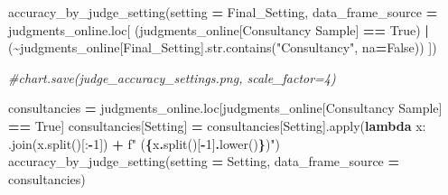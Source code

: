 \documentclass[
]{article}
\newenvironment{Shaded}{\begin{snugshade}}{\end{snugshade}}
\newcommand{\BuiltInTok}[1]{#1}
\newcommand{\CommentTok}[1]{\textcolor[rgb]{0.56,0.35,0.01}{\textit{#1}}}
\newcommand{\DecValTok}[1]{\textcolor[rgb]{0.00,0.00,0.81}{#1}}
\newcommand{\KeywordTok}[1]{\textcolor[rgb]{0.13,0.29,0.53}{\textbf{#1}}}
\newcommand{\NormalTok}[1]{#1}
\newcommand{\OperatorTok}[1]{\textcolor[rgb]{0.81,0.36,0.00}{\textbf{#1}}}
\newcommand{\SpecialCharTok}[1]{\textcolor[rgb]{0.81,0.36,0.00}{\textbf{#1}}}
\newcommand{\SpecialStringTok}[1]{\textcolor[rgb]{0.31,0.60,0.02}{#1}}
\newcommand{\StringTok}[1]{\textcolor[rgb]{0.31,0.60,0.02}{#1}}
\newcommand{\VariableTok}[1]{\textcolor[rgb]{0.00,0.00,0.00}{#1}}
\begin{document}
\begin{Shaded}
\begin{Highlighting}[]
\NormalTok{accuracy\_by\_judge\_setting(setting }\OperatorTok{=} \StringTok{\textquotesingle{}Final\_Setting\textquotesingle{}}\NormalTok{, data\_frame\_source }\OperatorTok{=}\NormalTok{ judgments\_online.loc[}
\NormalTok{    (judgments\_online[}\StringTok{\textquotesingle{}Consultancy Sample\textquotesingle{}}\NormalTok{] }\OperatorTok{==} \VariableTok{True}\NormalTok{) }\OperatorTok{|}
\NormalTok{    (}\OperatorTok{\textasciitilde{}}\NormalTok{judgments\_online[}\StringTok{\textquotesingle{}Final\_Setting\textquotesingle{}}\NormalTok{].}\BuiltInTok{str}\NormalTok{.contains(}\StringTok{"Consultancy"}\NormalTok{, na}\OperatorTok{=}\VariableTok{False}\NormalTok{))}
\NormalTok{])}
\end{Highlighting}
\end{Shaded}

\begin{Shaded}
\begin{Highlighting}[]


\CommentTok{\#chart.save(\textquotesingle{}judge\_accuracy\_settings.png\textquotesingle{}, scale\_factor=4)}
\end{Highlighting}
\end{Shaded}

\begin{Shaded}
\begin{Highlighting}[]
\NormalTok{consultancies }\OperatorTok{=}\NormalTok{ judgments\_online.loc[judgments\_online[}\StringTok{\textquotesingle{}Consultancy Sample\textquotesingle{}}\NormalTok{] }\OperatorTok{==} \VariableTok{True}\NormalTok{]}
\NormalTok{consultancies[}\StringTok{\textquotesingle{}Setting\textquotesingle{}}\NormalTok{] }\OperatorTok{=}\NormalTok{ consultancies[}\StringTok{\textquotesingle{}Setting\textquotesingle{}}\NormalTok{].}\BuiltInTok{apply}\NormalTok{(}\KeywordTok{lambda}\NormalTok{ x: }\StringTok{\textquotesingle{} \textquotesingle{}}\NormalTok{.join(x.split()[:}\OperatorTok{{-}}\DecValTok{1}\NormalTok{]) }\OperatorTok{+} \SpecialStringTok{f" (}\SpecialCharTok{\{}\NormalTok{x}\SpecialCharTok{.}\NormalTok{split()[}\OperatorTok{{-}}\DecValTok{1}\NormalTok{]}\SpecialCharTok{.}\NormalTok{lower()}\SpecialCharTok{\}}\SpecialStringTok{)"}\NormalTok{)}
\NormalTok{accuracy\_by\_judge\_setting(setting }\OperatorTok{=} \StringTok{\textquotesingle{}Setting\textquotesingle{}}\NormalTok{, data\_frame\_source }\OperatorTok{=}\NormalTok{ consultancies)}
\end{Highlighting}
\end{Shaded}
\end{document}

